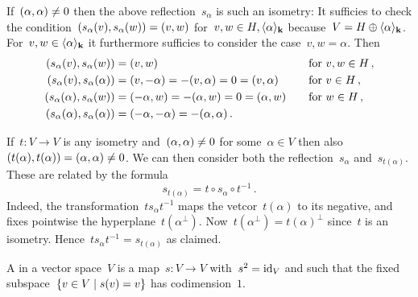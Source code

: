 \begin{recall}
\begin{enumerate}
      If~$(\alpha, \alpha) \neq 0$ then the above reflection~$s_\alpha$ is such an isometry:
      It sufficies to check the condition~$(s_\alpha(v), s_\alpha(w)) = (v,w)$ for~$v, w \in H, \langle\alpha\rangle_{\mathbf{k}}$ because~$V = H \oplus \langle\alpha\rangle_{\mathbf{k}}$.
      For~$v, w \in \langle\alpha\rangle_{\mathbf{k}}$ it furthermore sufficies to consider the case~$v, w = \alpha$.
      Then
      \begin{alignat*}{2}
        (s_\alpha(v), s_\alpha(w))
        &=
        (v, w)
        &
        \quad
        &\text{for~$v, w \in H$} \,,
        \\
        (s_\alpha(v), s_\alpha(\alpha))
        &=
        (v, -\alpha)
        =
        -(v,\alpha)
        =
        0
        =
        (v, \alpha)
        &
        \quad
        &\text{for~$v \in H$} \,,
        \\
        (s_\alpha(\alpha), s_\alpha(w))
        &=
        (-\alpha, w)
        =
        -(\alpha, w)
        =
        0
        =
        (\alpha, w)
        &
        \quad
        &\text{for~$w \in H$} \,,
        \\
        (s_\alpha(\alpha), s_\alpha(\alpha))
        &=
        (-\alpha, -\alpha)
        =
        -(\alpha,\alpha) \,.
        &
        {}
        &
        {}
      \end{alignat*}
      
      If~$t \colon V \to V$ is any isometry and~$(\alpha, \alpha) \neq 0$ for some~$\alpha \in V$ then also~$(t(\alpha), t(\alpha)) = (\alpha, \alpha) \neq 0$.
      We can then consider both the reflection~$s_\alpha$ and~$s_{t(\alpha)}$.
      These are related by the formula
      \[
        s_{t(\alpha)}
        =
        t \circ s_{\alpha} \circ t^{-1} \,.
      \]
      Indeed, the transformation~$t s_{\alpha} t^{-1}$ maps the vetcor~$t(\alpha)$ to its negative, and fixes pointwise the hyperplane~$t(\alpha^\perp)$.
      Now~$t(\alpha^\perp) = t(\alpha)^\perp$ since~$t$ is an isometry.
      Hence~$t s_{\alpha} t^{-1}  = s_{t(\alpha)}$ as claimed.
  \end{enumerate}
\end{recall} 


\begin{definition}
  A  in a vector space~$V$ is a map~$s \colon V \to V$ with~$s^2 = \operatorname{id}_V$ and such that the fixed subspace~$\{v \in V \suchthat s(v) = v\}$ has codimension~$1$.
\end{definition}


